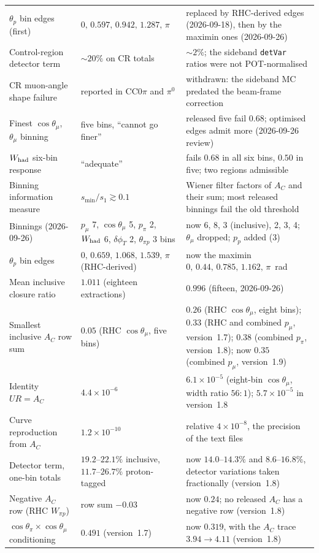 \begin{center}
\begin{tabular}{p{4.3cm}p{4.2cm}p{6.4cm}}
$\theta_p$ bin edges (first)        & $0,\,0.597,\,0.942,\,1.287,\,\pi$ & replaced by RHC-derived edges (2026-09-18), then by the maximin ones (2026-09-26) \\
Control-region detector term        & $\sim\!20\%$ on CR totals & $\sim\!2\%$; the sideband \texttt{detVar} ratios were not POT-normalised \\
CR muon-angle shape failure         & reported in CC$0\pi$ and $\pi^0$ & withdrawn: the sideband MC predated the beam-frame correction \\
Finest $\cos\theta_\mu$, $\theta_\mu$ binning & five bins, ``cannot go finer'' & released five fail $0.68$; optimised edges admit more (2026-09-26 review) \\
$W_{\rm had}$ six-bin response       & ``adequate''     & fails $0.68$ in all six bins, $0.50$ in five; two regions admissible \\
Binning information measure         & $s_{\min}/s_1\gtrsim0.1$ & Wiener filter factors of $A_C$ and their sum; most released binnings fail the old threshold \\
Binnings (2026-09-26)               & $p_\mu$ 7, $\cos\theta_\mu$ 5, $p_\pi$ 2, $W_{\rm had}$ 6, $\delta\phi_T$ 2, $\theta_{\pi p}$ 3 bins & now 6, 8, 3 (inclusive), 2, 3, 4; $\theta_\mu$ dropped; $p_p$ added (3) \\
$\theta_p$ bin edges                & $0,\,0.659,\,1.068,\,1.539,\,\pi$ (RHC-derived) & now the maximin $0,\,0.44,\,0.785,\,1.162,\,\pi$~rad \\
Mean inclusive closure ratio        & $1.011$ (eighteen extractions) & $0.996$ (fifteen, 2026-09-26) \\
Smallest inclusive $A_C$ row sum    & $0.05$ (RHC $\cos\theta_\mu$, five bins) & $0.26$ (RHC $\cos\theta_\mu$, eight bins); $0.33$ (RHC and combined $p_\mu$, version~1.7); $0.38$ (combined $p_\pi$, version~1.8); now $0.35$ (combined $p_\mu$, version~1.9) \\
Identity $UR=A_C$                   & $4.4\times10^{-6}$ & $6.1\times10^{-5}$ (eight-bin $\cos\theta_\mu$, width ratio $56{:}1$); $5.7\times10^{-5}$ in version~1.8 \\
Curve reproduction from $A_C$       & $1.2\times10^{-10}$ & relative $4\times10^{-8}$, the precision of the text files \\
Detector term, one-bin totals       & $19.2$--$22.1\%$ inclusive, $11.7$--$26.7\%$ proton-tagged & now $14.0$--$14.3\%$ and $8.6$--$16.8\%$, detector variations taken fractionally (version~1.8) \\
Negative $A_C$ row (RHC $W_{\pi p}$) & row sum $-0.03$ & now $0.24$; no released $A_C$ has a negative row (version~1.8) \\
$\cos\theta_\pi\times\cos\theta_\mu$ conditioning & $0.491$ (version~1.7) & now $0.319$, with the $A_C$ trace $3.94\to4.11$ (version~1.8) \\
\bottomrule
\end{tabular}
\end{center}


